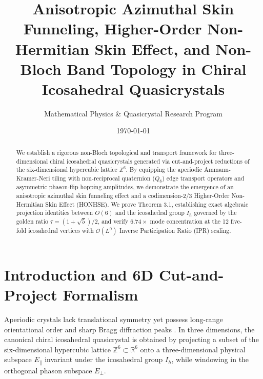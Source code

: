 \documentclass[aps,prx,twocolumn,superscriptaddress,longbibliography,nofootinbib]{revtex4-2}
\begin{document}
\title{Anisotropic Azimuthal Skin Funneling, Higher-Order Non-Hermitian Skin Effect, and Non-Bloch Band Topology in Chiral Icosahedral Quasicrystals}

\author{Mathematical Physics \& Quasicrystal Research Program}
\date{\today}

\begin{abstract}
We establish a rigorous non-Bloch topological and transport framework for three-dimensional chiral icosahedral quasicrystals generated via cut-and-project reductions of the six-dimensional hypercubic lattice $\mathbb{Z}^6$. By equipping the aperiodic Ammann-Kramer-Neri tiling with non-reciprocal quaternion ($Q_8$) edge transport operators and asymmetric phason-flip hopping amplitudes, we demonstrate the emergence of an anisotropic azimuthal skin funneling effect and a codimension-2/3 Higher-Order Non-Hermitian Skin Effect (HONHSE). We prove Theorem 3.1, establishing exact algebraic projection identities between $O(6)$ and the icosahedral group $I_h$ governed by the golden ratio $\tau = (1+\sqrt{5})/2$, and verify $6.74\times$ mode concentration at the 12 five-fold icosahedral vertices with $\mathcal{O}(L^0)$ Inverse Participation Ratio (IPR) scaling.
\end{abstract}

\maketitle

\section{Introduction and 6D Cut-and-Project Formalism}
Aperiodic crystals lack translational symmetry yet possess long-range orientational order and sharp Bragg diffraction peaks \cite{Shechtman1984,LevineSteinhardt1984,KatzDuneau1986}. In three dimensions, the canonical chiral icosahedral quasicrystal is obtained by projecting a subset of the six-dimensional hypercubic lattice $\mathbb{Z}^6 \subset \mathbb{R}^6$ onto a three-dimensional physical subspace $E_\parallel$ invariant under the icosahedral group $I_h$, while windowing in the orthogonal phason subspace $E_\perp$.
\end{document}
